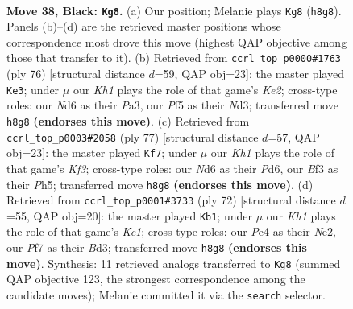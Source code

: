 \documentclass[11pt]{article}
\begin{document}
\clearpage

\begin{figure}[p]\centering
\begin{subfigure}{0.46\textwidth}\centering
\resizebox{\linewidth}{!}{%
\newchessgame
\chessboard[
  setfen={1r5k/2p2p1p/p1Pn1K2/P4p2/4p3/5bP1/8/RNB5 b - - 7 38},
  showmover=false,
  pgfstyle=straightmove, color=movearrow, markmove={h8-g8}
]}
\caption{}
\end{subfigure}\hfill
\begin{subfigure}{0.46\textwidth}\centering
\resizebox{\linewidth}{!}{%
\newchessgame
\chessboard[
  setfen={8/2b5/1p5p/p2k1bpB/3P4/P2N2P1/1P2KP2/8 w - - 1 39},
  showmover=false,
  pgfstyle=straightmove, color=movearrow, markmove={e2-e3}
]}
\caption{}
\end{subfigure}
\\[4pt]
\begin{subfigure}{0.46\textwidth}\centering
\resizebox{\linewidth}{!}{%
\newchessgame
\chessboard[
  setfen={8/2p5/r2p1k2/5p1p/P3n1pP/1PP5/6P1/2B1R1K1 b - - 0 39},
  showmover=false,
  pgfstyle=straightmove, color=movearrow, markmove={f6-f7}
]}
\caption{}
\end{subfigure}\hfill
\begin{subfigure}{0.46\textwidth}\centering
\resizebox{\linewidth}{!}{%
\newchessgame
\chessboard[
  setfen={3r4/2b5/5kpr/2p5/5PRP/P2B4/1PP1N3/2K5 w - - 2 37},
  showmover=false,
  pgfstyle=straightmove, color=movearrow, markmove={c1-b1}
]}
\caption{}
\end{subfigure}
\caption{\textbf{Move 38, Black: \texttt{Kg8}.} (a) Our position; Melanie plays \texttt{Kg8} (\texttt{h8g8}). Panels (b)--(d) are the retrieved master positions whose correspondence most drove this move (highest QAP objective among those that transfer to it). (b) Retrieved from \texttt{ccrl\_top\_p0000\#1763} (ply 76) [structural distance $d$=59, QAP obj=23]: the master played \texttt{Ke3}; under $\mu$ our \emph{Kh1} plays the role of that game's \emph{Ke2}; cross-type roles: our \emph{N}d6 as their \emph{P}a3, our \emph{P}f5 as their \emph{N}d3; transferred move \texttt{h8g8} \textbf{(endorses this move)}. (c) Retrieved from \texttt{ccrl\_top\_p0003\#2058} (ply 77) [structural distance $d$=57, QAP obj=23]: the master played \texttt{Kf7}; under $\mu$ our \emph{Kh1} plays the role of that game's \emph{Kf3}; cross-type roles: our \emph{N}d6 as their \emph{P}d6, our \emph{B}f3 as their \emph{P}h5; transferred move \texttt{h8g8} \textbf{(endorses this move)}. (d) Retrieved from \texttt{ccrl\_top\_p0001\#3733} (ply 72) [structural distance $d$=55, QAP obj=20]: the master played \texttt{Kb1}; under $\mu$ our \emph{Kh1} plays the role of that game's \emph{Kc1}; cross-type roles: our \emph{P}e4 as their \emph{N}e2, our \emph{P}f7 as their \emph{B}d3; transferred move \texttt{h8g8} \textbf{(endorses this move)}. Synthesis: 11 retrieved analogs transferred to \texttt{Kg8} (summed QAP objective 123, the strongest correspondence among the candidate moves); Melanie committed it via the \texttt{search} selector.}
\label{fig:thought-m75}
\end{figure}
\end{document}
